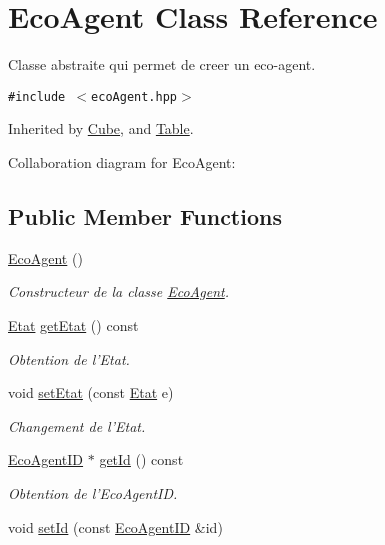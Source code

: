 \hypertarget{classEcoAgent}{
\section{EcoAgent Class Reference}
\label{classEcoAgent}
}
Classe abstraite qui permet de creer un eco-agent.  


{\tt \#include $<$ecoAgent.hpp$>$}

Inherited by \hyperlink{classCube}{Cube}, and \hyperlink{classTable}{Table}.

Collaboration diagram for EcoAgent:\subsection*{Public Member Functions}
\begin{CompactItemize}
\item 
\hyperlink{classEcoAgent_a0d07e98fbbb24b69a7d5d7fc0a75d2b}{EcoAgent} ()
\begin{CompactList}\small\item\em Constructeur de la classe \hyperlink{classEcoAgent}{EcoAgent}. \item\end{CompactList}\item 
\hyperlink{etat_8hpp_767b7a63d7677f92d697621b4166af1b}{Etat} \hyperlink{classEcoAgent_91160732f8c4dd585ac5d8ad69bf3891}{getEtat} () const 
\begin{CompactList}\small\item\em Obtention de l'Etat. \item\end{CompactList}\item 
void \hyperlink{classEcoAgent_e06a7430bd88705a327cf498c8420a2b}{setEtat} (const \hyperlink{etat_8hpp_767b7a63d7677f92d697621b4166af1b}{Etat} e)
\begin{CompactList}\small\item\em Changement de l'Etat. \item\end{CompactList}\item 
\hyperlink{classEcoAgentID}{EcoAgentID} $\ast$ \hyperlink{classEcoAgent_888101c39bee652681dffcb36bd9bb01}{getId} () const 
\begin{CompactList}\small\item\em Obtention de l'EcoAgentID. \item\end{CompactList}\item 
void \hyperlink{classEcoAgent_ef2dde1272916b9f3a8f5a663bf96f69}{setId} (const \hyperlink{classEcoAgentID}{EcoAgentID} \&id)

\end{CompactItemize}
